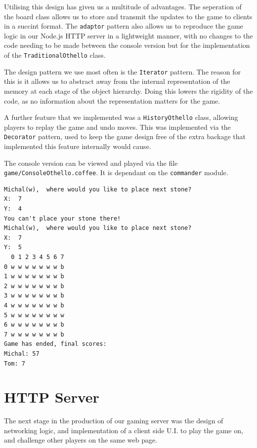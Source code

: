 \documentclass[a4wide, 11pt]{article}
\begin{document}
Utilising this design has given us a multitude of advantages. The seperation of the board class allows us to store and transmit the updates to the game to clients in a succint format. The \texttt{adaptor} pattern also allows us to reproduce the game logic in our Node.js HTTP server in a lightweight manner, with no changes to the code needing to be made between the console version but for the implementation of the \texttt{TraditionalOthello} class.

The design pattern we use most often is the \texttt{Iterator} pattern. The reason for this is it allows us to abstract away from the internal representation of the memory at each stage of the object hierarchy. Doing this lowers the rigidity of the code, as no information about the representation matters for the game.

A further feature that we implemented was a \texttt{HistoryOthello} class, allowing players to replay the game and undo moves. This was implemented via the \texttt{Decorator} pattern, used to keep the game design free of the extra backage that implemented this feature internally would cause.

The console version can be viewed and played via the file \texttt{game/ConsoleOthello.coffee}. It is dependant on the \texttt{commander} module.

\begin{verbatim}
Michal(w),  where would you like to place next stone?
X:  7
Y:  4
You can't place your stone there!
Michal(w),  where would you like to place next stone?
X:  7
Y:  5
  0 1 2 3 4 5 6 7
0 w w w w w w w b
1 w w w w w w w b
2 w w w w w w w b
3 w w w w w w w b
4 w w w w w w w b
5 w w w w w w w w
6 w w w w w w w b
7 w w w w w w w b
Game has ended, final scores:
Michal: 57
Tom: 7
\end{verbatim}
\section{HTTP Server}

The next stage in the production of our gaming server was the design of networking logic, and implementation of a client side U.I. to play the game on, and challenge other players on the same web page.
\end{document}
